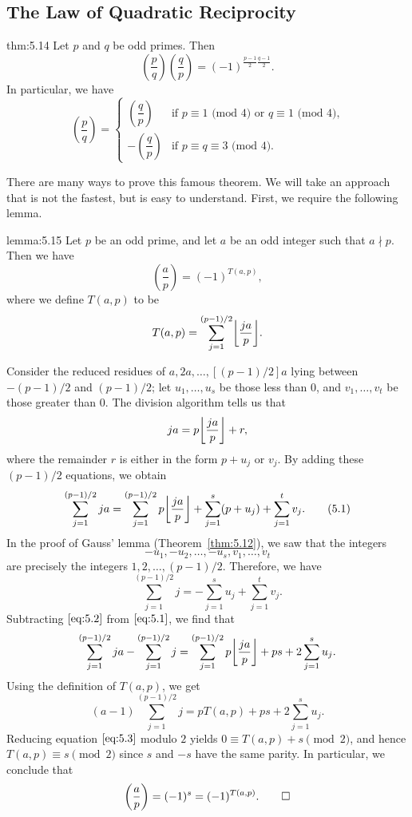\subsection{The Law of Quadratic Reciprocity}\label{subsec:5.4}

\vspace{2ex}
\begin{theo}{thm:5.14}
    Let $p$ and $q$ be odd primes. Then 
    \[ \left( \frac pq \right) \left( \frac qp \right) = (-1)^{\frac{p-1}2 \frac{q-1}2}. \] 
    In particular, we have 
    \[ \left( \frac pq \right) = \begin{cases}
        \left(\dfrac qp \right) & \text{if $p \equiv 1$ (mod $4$) or $q \equiv 1$ (mod $4$),} \\[2ex]
        -\left(\dfrac qp \right) & \text{if $p \equiv q \equiv 3$ (mod $4$).} 
    \end{cases} \] 
\end{theo}

There are many ways to prove this famous theorem. We will take an approach that is 
not the fastest, but is easy to understand. First, we require the following lemma. 

\begin{lemma}{lemma:5.15}
    Let $p$ be an odd prime, and let $a$ be an odd integer such that $a \nmid p$. 
    Then we have 
    \[ \left( \frac ap \right) = (-1)^{T(a, p)}, \] 
    where we define $T(a, p)$ to be 
    \[ T(a, p) = \sum_{j=1}^{(p-1)/2} \floor*{\frac{ja}{p}}. \] 
\end{lemma}
\begin{pf}
    Consider the reduced residues of $a, 2a, \dots, [(p-1)/2]a$ lying between 
    $-(p-1)/2$ and $(p-1)/2$; let $u_1, \dots, u_s$ be those less than $0$, 
    and $v_1, \dots, v_t$ be those greater than $0$. The division algorithm 
    tells us that 
    \[ ja = p\floor*{\frac{ja}{p}} + r, \] 
    where the remainder $r$ is either in the form $p + u_j$ or $v_j$. By 
    adding these $(p-1)/2$ equations, we obtain 
    \[ \sum_{j=1}^{(p-1)/2} ja = \sum_{j=1}^{(p-1)/2} p\floor*{\frac{ja}{p}} 
    + \sum_{j=1}^s (p + u_j) + \sum_{j=1}^t v_j. \tag{5.1}\label{eq:5.1} \] 
    In the proof of Gauss' lemma (Theorem~\ref{thm:5.12}), we saw that the integers 
    \[ -u_1, -u_2, \dots, -u_s, v_1, \dots, v_t \] 
    are precisely the integers $1, 2, \dots, (p-1)/2$. Therefore, we have 
    \[ \sum_{j=1}^{(p-1)/2} j = -\sum_{j=1}^s u_j + \sum_{j=1}^t v_j. 
    \tag{5.2}\label{eq:5.2} \] 
    Subtracting $\eqref{eq:5.2}$ from $\eqref{eq:5.1}$, we find that 
    \[ \sum_{j=1}^{(p-1)/2} ja - \sum_{j=1}^{(p-1)/2} j 
    = \sum_{j=1}^{(p-1)/2} p\floor*{\frac{ja}{p}} + ps + 2 \sum_{j=1}^s u_j. \] 
    Using the definition of $T(a, p)$, we get 
    \[ (a-1) \sum_{j=1}^{(p-1)/2} j = pT(a, p) + ps + 2\sum_{j=1}^s u_j. 
    \tag{5.3}\label{eq:5.3} \] 
    Reducing equation $\eqref{eq:5.3}$ modulo $2$ yields $0 \equiv T(a, p) 
    + s \pmod 2$, and hence $T(a, p) \equiv s \pmod 2$ since $s$ and 
    $-s$ have the same parity. In particular, we conclude that 
    \[ \left( \frac ap \right) = (-1)^s = (-1)^{T(a, p)}. \qedhere \] 
\end{pf}

